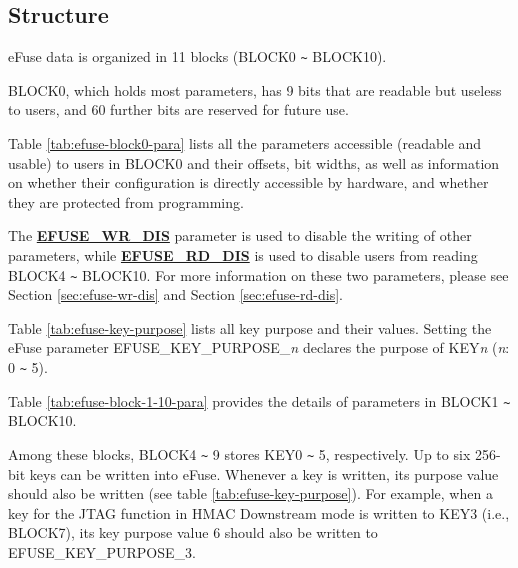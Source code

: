 \documentclass[main\_\_EN.tex]{subfiles}
\begin{document}
\subsection{Structure}

eFuse data is organized in 11 blocks (BLOCK0 \verb+~+ BLOCK10).

BLOCK0, which holds most parameters, has 9 bits that are readable but useless to users, and 60 further bits are reserved for future use.

Table \ref{tab:efuse-block0-para} lists all the parameters accessible (readable and usable) to users in BLOCK0 and their offsets, bit widths, as well as information on whether their configuration is directly accessible by hardware, and whether they are protected from programming.

The {\bfseries \hyperref[fielddesc:EFUSEWRDIS]{EFUSE\_WR\_DIS}} parameter is used to disable the writing of other parameters, while {\bfseries \hyperref[fielddesc:EFUSERDDIS]{EFUSE\_RD\_DIS}} is used to disable users from reading BLOCK4 \verb+~+ BLOCK10. For more information on these two parameters, please see Section \ref{sec:efuse-wr-dis} and Section \ref{sec:efuse-rd-dis}.

\clearpage
\begin{landscape}



\end{landscape}
\restoregeometry
\clearpage


Table \ref{tab:efuse-key-purpose} lists all key purpose and their values. Setting the eFuse parameter EFUSE\_KEY\_PURPOSE\_\textcolor{myred}{\it{n}} declares the purpose of KEY\textcolor{myred}{\it{n}} (\textcolor{myred}{\it{n}}: 0 \verb+~+ 5).



Table  \ref{tab:efuse-block-1-10-para} provides the details of parameters in BLOCK1 \verb+~+ BLOCK10.

\clearpage
\begin{landscape}



\end{landscape}
\restoregeometry
\clearpage



Among these blocks, BLOCK4 \verb+~+ 9 stores KEY0 \verb+~+ 5, respectively. Up to six 256-bit keys can be written into eFuse. Whenever a key is written, its purpose value should also be written (see table \ref{tab:efuse-key-purpose}). For example, when a key for the JTAG function in HMAC Downstream mode is written to KEY\textcolor{myred}{3} (i.e., BLOCK7), its key purpose value 6 should also be written to EFUSE\_KEY\_PURPOSE\_\textcolor{myred}{3}.
\end{document}

